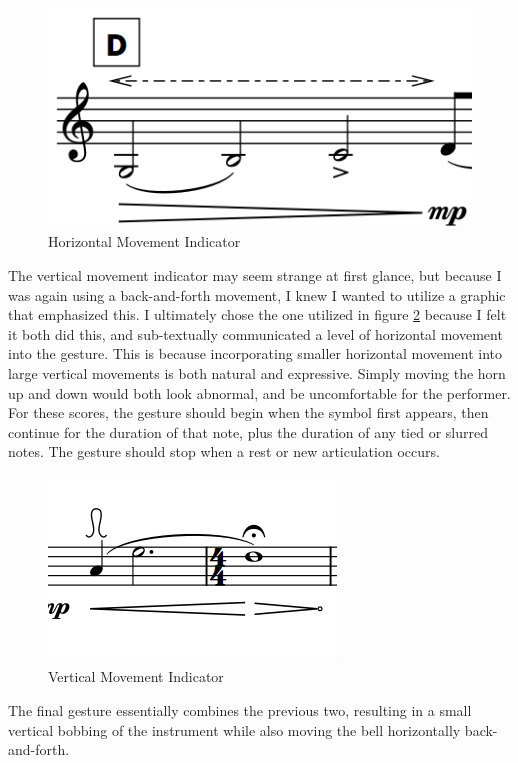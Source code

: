 \begin{figure}
    \centering
    \includegraphics{Scores/horizontal.png}
    \caption{Horizontal Movement Indicator}
    \label{fig:horMovement}
\end{figure}

The vertical movement indicator may seem strange at first glance, but because I was again using a back-and-forth movement, I knew I wanted to utilize a graphic that emphasized this. I ultimately chose the one utilized in figure \ref{fig:vertMovement} because I felt it both did this, and sub-textually communicated a level of horizontal movement into the gesture. This is because incorporating smaller horizontal movement into large vertical movements is both natural and expressive. Simply moving the horn up and down would both look abnormal, and be uncomfortable for the performer. For these scores, the gesture should begin when the symbol first appears, then continue for the duration of that note, plus the duration of any tied or slurred notes. The gesture should stop when a rest or new articulation occurs.

\begin{figure}
    \centering
    \includegraphics{Scores/wave.png}
    \caption{Vertical Movement Indicator}
    \label{fig:vertMovement}
\end{figure}

The final gesture essentially combines the previous two, resulting in a small vertical bobbing of the instrument while also moving the bell horizontally back-and-forth.


